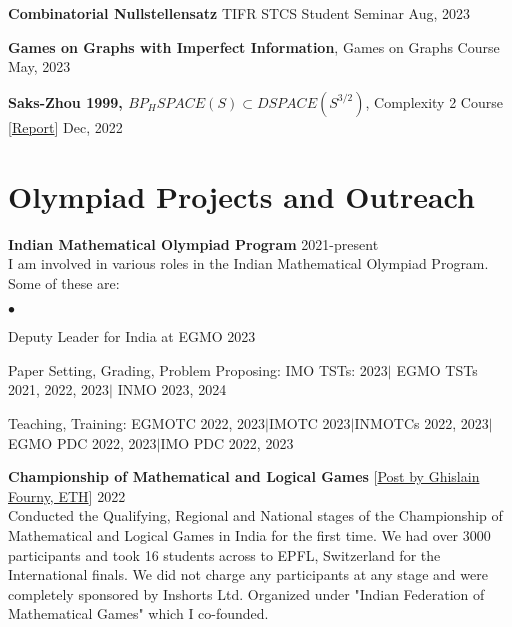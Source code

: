 \documentclass[margin,line, 10pt]{res}
\newenvironment{list2}{
  \begin{list}{$\bullet$}{%
      \setlength{\itemsep}{0in}
      \setlength{\parsep}{0in} \setlength{\parskip}{0in}
      \setlength{\topsep}{0in} \setlength{\partopsep}{0in} 
      \setlength{\leftmargin}{0.2in}}}{\end{list}}
\begin{document}
\begin{resume}
\vspace*{-2.5mm}
{\bf Combinatorial Nullstellensatz} TIFR STCS Student Seminar \hfill Aug, 2023

\vspace*{-2.5mm}
{\bf Games on Graphs with Imperfect Information}, Games on Graphs Course \hfill May, 2023

\vspace*{-2.5mm}
{\bf Saks-Zhou 1999, $BP_HSPACE(S)\subset DSPACE(S^{3/2})$}, Complexity 2 Course \hspace{0.5em} [\href{https://www.dropbox.com/scl/fi/d3o6bhib7i7ifok6b8t79/Saks-and-Zhou-1999-Report-Aryan-Agarwala-and-Rohan-Goyal.pdf?rlkey=1xirwrhdz8541vuiq9l189apk&dl=0}{Report}] \hfill Dec, 2022 

\section{\sc Olympiad Projects and Outreach}
{\bf Indian Mathematical Olympiad Program} \hfill 2021-present\\
I am involved in various roles in the Indian Mathematical Olympiad Program. Some of these are:
\begin{list2}
    \item Deputy Leader for India at EGMO 2023
    \item Paper Setting, Grading, Problem Proposing: IMO TSTs: 2023$\mid$ EGMO TSTs 2021, 2022, 2023$\mid$  INMO 2023, 2024
    \item Teaching, Training: EGMOTC 2022, 2023$\mid$IMOTC 2023$\mid$INMOTCs 2022, 2023$\mid$EGMO PDC 2022, 2023$\mid$IMO PDC 2022, 2023
\end{list2}

{\bf Championship of Mathematical and Logical Games} {\hspace{1em} [\href{https://www.linkedin.com/posts/ghislainfourny_hamen-bahut-bahut-badhia-laga-ki-pahle-baar-activity-6969912358307536896--pLr?utm_source=share&utm_medium=member_desktop}{Post by Ghislain Fourny, ETH}]} \hfill 2022\\
Conducted the Qualifying, Regional and National stages of the Championship of Mathematical and Logical Games in India for the first time. We had over 3000 participants and took 16 students across to EPFL, Switzerland for the International finals. We did not charge any participants at any stage and were completely sponsored by Inshorts Ltd. Organized under "Indian Federation of Mathematical Games" which I co-founded. 


\end{resume}
\end{document}
